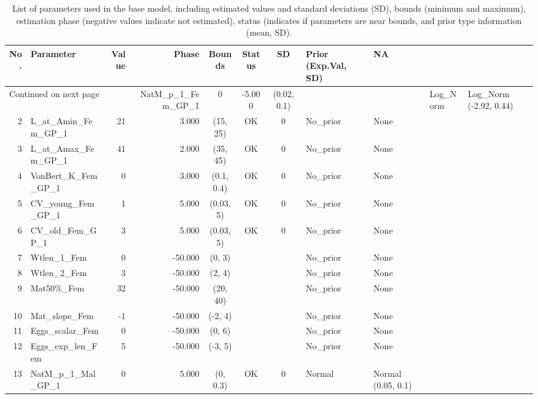 \documentclass[12pt,]{article}
\begin{document}
\FloatBarrier

\begin{landscape}
\begin{longtable}{rlrrcccll}
\caption{List of parameters used in
                                          the base model, including estimated 
                                          values and standard deviations (SD), 
                                          bounds (minimum and maximum), 
                                          estimation phase (negative values indicate
                                          not estimated), status (indicates if 
                                          parameters are near bounds, and prior type
                                          information (mean, SD).} \\ 
  \hline
No. & Parameter & Value & Phase & Bounds & Status & SD & Prior (Exp.Val, SD)  & NA \\ 
  \hline 
\endhead 
\hline 
\multicolumn{3}{l}{\footnotesize Continued on next page} 
\endfoot 
\endlastfoot 
 \hline
1 & NatM\_p\_1\_Fem\_GP\_1 & 0 & -5.000 & (0.02, 0.1) &  &  & Log\_Norm & Log\_Norm (-2.92, 0.44) \\ 
  2 & L\_at\_Amin\_Fem\_GP\_1 & 21 & 3.000 & (15, 25) & OK & 0 & No\_prior & None \\ 
  3 & L\_at\_Amax\_Fem\_GP\_1 & 41 & 2.000 & (35, 45) & OK & 0 & No\_prior & None \\ 
  4 & VonBert\_K\_Fem\_GP\_1 & 0 & 3.000 & (0.1, 0.4) & OK & 0 & No\_prior & None \\ 
  5 & CV\_young\_Fem\_GP\_1 & 1 & 5.000 & (0.03, 5) & OK & 0 & No\_prior & None \\ 
  6 & CV\_old\_Fem\_GP\_1 & 3 & 5.000 & (0.03, 5) & OK & 0 & No\_prior & None \\ 
  7 & Wtlen\_1\_Fem & 0 & -50.000 & (0, 3) &  &  & No\_prior & None \\ 
  8 & Wtlen\_2\_Fem & 3 & -50.000 & (2, 4) &  &  & No\_prior & None \\ 
  9 & Mat50\%\_Fem & 32 & -50.000 & (20, 40) &  &  & No\_prior & None \\ 
  10 & Mat\_slope\_Fem & -1 & -50.000 & (-2, 4) &  &  & No\_prior & None \\ 
  11 & Eggs\_scalar\_Fem & 0 & -50.000 & (0, 6) &  &  & No\_prior & None \\ 
  12 & Eggs\_exp\_len\_Fem & 5 & -50.000 & (-3, 5) &  &  & No\_prior & None \\ 
  13 & NatM\_p\_1\_Mal\_GP\_1 & 0 & 5.000 & (0, 0.3) & OK & 0 & Normal & Normal (0.05, 0.1) \\ 

\end{longtable}
\end{landscape}
\end{document}

